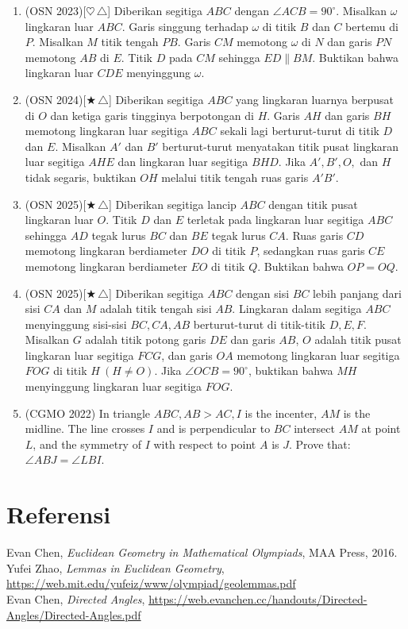 \documentclass[letterpaper, 13pt]{scrartcl}
\begin{document}
\begin{enumerate}
  \item (OSN 2023)[$\heartsuit\,\triangle$] Diberikan segitiga $ABC$ dengan $\angle ACB = 90^\circ$. Misalkan $\omega$ lingkaran luar $ABC$. Garis singgung terhadap $\omega$ di titik $B$ dan $C$ bertemu di $P$. Misalkan $M$ titik tengah $PB$. Garis $CM$ memotong $\omega$ di $N$ dan garis $PN$ memotong $AB$ di $E$. Titik $D$ pada $CM$ sehingga $ED \parallel BM$. Buktikan bahwa lingkaran luar $CDE$ menyinggung $\omega$.

  \item (OSN 2024)[$\bigstar\,\triangle$] Diberikan segitiga $ABC$ yang lingkaran luarnya berpusat di $O$ dan ketiga garis tingginya berpotongan di $H$. Garis $AH$ dan garis $BH$ memotong lingkaran luar segitiga $ABC$ sekali lagi berturut-turut di titik $D$ dan $E$. Misalkan $A'$ dan $B'$ berturut-turut menyatakan titik pusat lingkaran luar segitiga $AHE$ dan lingkaran luar segitiga $BHD$. Jika $A', B', O,$ dan $H$ tidak segaris, buktikan $OH$ melalui titik tengah ruas garis $A'B'$.


  \item (OSN 2025)[$\bigstar\,\triangle$] Diberikan segitiga lancip $ABC$ dengan titik pusat lingkaran luar $O$. Titik $D$ dan $E$ terletak pada lingkaran luar segitiga $ABC$ sehingga $AD$ tegak lurus $BC$ dan $BE$ tegak lurus $CA$. Ruas garis $CD$ memotong lingkaran berdiameter $DO$ di titik $P$, sedangkan ruas garis $CE$ memotong lingkaran berdiameter $EO$ di titik $Q$. Buktikan bahwa $OP = OQ$.

  \item (OSN 2025)[$\bigstar\,\triangle$] Diberikan segitiga $ABC$ dengan sisi $BC$ lebih panjang dari sisi $CA$ dan $M$ adalah titik tengah sisi $AB$. Lingkaran dalam segitiga $ABC$ menyinggung sisi-sisi $BC, CA, AB$ berturut-turut di titik-titik $D, E, F$. Misalkan $G$ adalah titik potong garis $DE$ dan garis $AB$, $O$ adalah titik pusat lingkaran luar segitiga $FCG$, dan garis $OA$ memotong lingkaran luar segitiga $FOG$ di titik $H \ (H \ne O)$. Jika $\angle OCB = 90^{\circ}$, buktikan bahwa $MH$ menyinggung lingkaran luar segitiga $FOG$.
  
  \item (CGMO 2022) In triangle $ABC,AB>AC,I$ is the incenter, $AM$ is the midline. The line crosses $I$ and is perpendicular to $BC $ intersect $AM$ at point $L$, and the symmetry of $I$ with respect to point $A$ is $J$. Prove that: $\angle ABJ= \angle LBI$.
\end{enumerate}

\section*{Referensi}
  Evan Chen, \emph{Euclidean Geometry in Mathematical Olympiads}, MAA Press, 2016.\\
  Yufei Zhao, \emph{Lemmas in Euclidean Geometry}, \url{https://web.mit.edu/yufeiz/www/olympiad/geolemmas.pdf}\\
  Evan Chen, \emph{Directed Angles}, \url{https://web.evanchen.cc/handouts/Directed-Angles/Directed-Angles.pdf}
\end{document}

